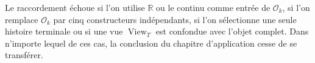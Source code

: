 \begin{falsifier}
Le raccordement échoue si l'on utilise \(\mathbb R\) ou le continu comme entrée de
\(\mathcal O_k\), si l'on remplace \(\mathcal O_k\) par cinq constructeurs
indépendants, si l'on sélectionne une seule histoire terminale ou si une vue
\(\operatorname{View}_T\) est confondue avec l'objet complet. Dans n'importe lequel
de ces cas, la conclusion du chapitre d'application cesse de se transférer.
\end{falsifier}
